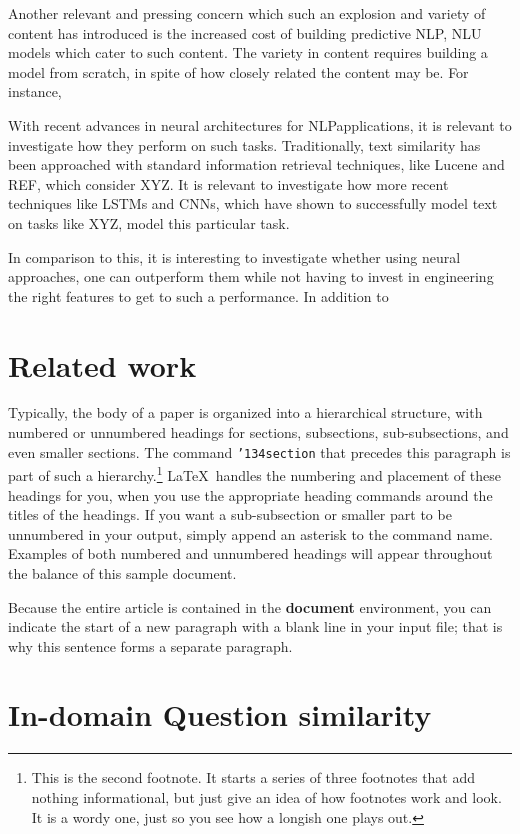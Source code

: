 \documentclass{sigkddExp}
\begin{document}
Another relevant and pressing concern which such an explosion and variety of content has introduced is the increased cost of building predictive NLP, NLU models which cater to such content. The variety in content requires building a model from scratch, in spite of how closely related the content may be. For instance, 

With recent advances in neural architectures for NLP\-applications, it is relevant to investigate how they perform on such tasks. Traditionally, text similarity has been approached with standard information retrieval techniques, like Lucene and REF, which consider XYZ. It is relevant to investigate how more recent techniques like LSTMs and CNNs, which have shown to successfully model text on tasks like XYZ, model this particular task. 

In comparison to this, it is interesting to investigate whether using neural approaches, one can outperform them while not having to invest in engineering the right features to get to such a performance. In addition to 

\section{Related work}
Typically, the body of a paper is organized
into a hierarchical structure, with numbered or unnumbered
headings for sections, subsections, sub-subsections, and even
smaller sections.  The command \texttt{{\char'134}section} that
precedes this paragraph is part of such a
hierarchy.\footnote{This is the second footnote.  It
starts a series of three footnotes that add nothing
informational, but just give an idea of how footnotes work
and look. It is a wordy one, just so you see
how a longish one plays out.} \LaTeX\ handles the numbering
and placement of these headings for you, when you use
the appropriate heading commands around the titles
of the headings.  If you want a sub-subsection or
smaller part to be unnumbered in your output, simply append an
asterisk to the command name.  Examples of both
numbered and unnumbered headings will appear throughout the
balance of this sample document.

Because the entire article is contained in
the \textbf{document} environment, you can indicate the
start of a new paragraph with a blank line in your
input file; that is why this sentence forms a separate paragraph.

\section{In-domain Question similarity}
\end{document}
